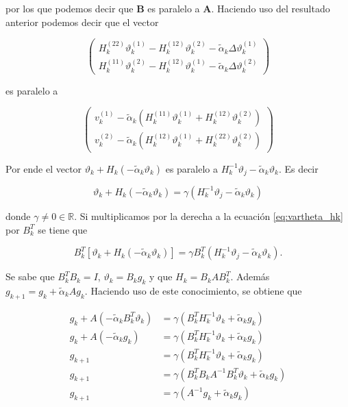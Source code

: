 por los que podemos decir que $\boldsymbol{B}$ es paralelo a $\boldsymbol{A}$. Haciendo uso del resultado anterior podemos decir que el vector

\begin{equation*}
    \begin{pmatrix}
        H_k^{(22)}\vartheta_k^{(1)}-H_k^{(12)}\vartheta_k^{(2)}-\tilde{\alpha}_k\Delta\vartheta_k^{(1)} \\[0.25cm]
        H_k^{(11)}\vartheta_k^{(2)}-H_k^{(12)}\vartheta_k^{(1)}-\tilde{\alpha}_k\Delta\vartheta_k^{(2)}
    \end{pmatrix}
\end{equation*}

es paralelo a

\begin{equation*}
    \begin{pmatrix}
        v_k^{(1)} - \tilde{\alpha}_k(H_k^{(11)}\vartheta_k^{(1)}+H_k^{(12)}\vartheta_k^{(2)}) \\[0.25cm]
        v_k^{(2)} - \tilde{\alpha}_k(H_k^{(12)}\vartheta_k^{(1)}+H_k^{(22)}\vartheta_k^{(2)})
    \end{pmatrix}
\end{equation*}

Por ende el vector $\vartheta_k+H_k(-\tilde{\alpha}_k\vartheta_k)$ es paralelo a  $H_k^{-1}\vartheta_j-\tilde{\alpha}_k\vartheta_k$. Es decir

\begin{equation}
    \vartheta_k+H_k(-\tilde{\alpha}_k\vartheta_k) = \gamma(H_k^{-1}\vartheta_j-\tilde{\alpha}_k\vartheta_k) \label{eq:vartheta_hk}
\end{equation}

donde $\gamma\neq 0  \in \mathbb{R}$. Si multiplicamos por la derecha a la ecuación \ref{eq:vartheta_hk} por $B_k^T$ se tiene que

\begin{equation*}
    B_k^T[\vartheta_k+H_k(-\tilde{\alpha}_k\vartheta_k)] = \gamma B_k^T(H_k^{-1}\vartheta_j-\tilde{\alpha}_k\vartheta_k).
\end{equation*}

Se sabe que $B^T_kB_k = I$, $\vartheta_k = B_kg_k$ y que $H_k = B_kAB_k^T$. Además $g_{k+1} = g_k+\tilde{\alpha}_kAg_k$. Haciendo uso de este conocimiento, se obtiene que

\begin{align*}
    g_k+A(-\tilde{\alpha}_kB^T_k\vartheta_k) & = \gamma(B_k^TH_k^{-1}\vartheta_k+\tilde{\alpha}_kg_k)       \\
    g_k+A(-\tilde{\alpha}_kg_k)              & = \gamma(B_k^TH_k^{-1}\vartheta_k+\tilde{\alpha}_kg_k)       \\
    g_{k+1}                                  & = \gamma(B_k^TH_k^{-1}\vartheta_k+\tilde{\alpha}_kg_k)       \\
    g_{k+1}                                  & = \gamma(B_k^TB_kA^{-1}B_k^T\vartheta_k+\tilde{\alpha}_kg_k) \\
    g_{k+1}                                  & = \gamma(A^{-1}g_k+\tilde{\alpha}_kg_k)
\end{align*}


